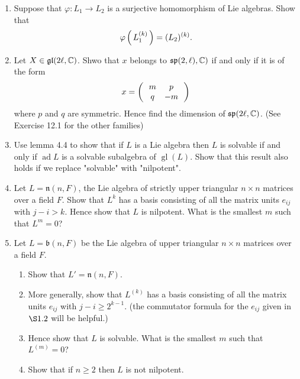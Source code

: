 \documentclass[12pt,a4paper]{report}
\newcommand{\GL}{\operatorname{gl}}
\newcommand{\AD}{\operatorname{ad}}
\begin{document}
\newcommand{\PPP}[1]{^{(#1)}}
\begin{enumerate}[label=4.\arabic*]

\item  Suppose that $\varphi:L_1 \to L_2$ is a surjective homomorphism of Lie algebras.  Show that 
\begin{align*}
	\varphi\PAREN{L_1\PPP{k}}=(L_2)\PPP{k}.
\end{align*}

\item Let $X \in \mathfrak{gl}(2\ell, \mathbb{C})$.  Shwo that $x$ belongs to $\mathfrak{sp}(2,\ell),\mathbb{C})$ if and only if it is of the form 
\begin{align*}
	x = \left (\,  \begin{array}{c c} m&p \\ q & -m \end{array}  \,\right )
\end{align*}where $p$ and $q$ are symmetric.  Hence find the dimension of $\mathfrak{sp}(2\ell, \mathbb{C})$.  (See Exercise 12.1 for the other families)

\item Use lemma 4.4 to show that if $L$ is a Lie algebra then $L$ is solvable if and only if $\AD L$ is a solvable subalgebra of $\GL(L)$.  Show that this result also holds if we replace "solvable" with "nilpotent".

\item Let $L=\mathfrak{n}(n,F)$, the Lie algebra of strictly upper triangular $n \times n$ matrices over a field $F$.  Show that $L^k$ has a basis consisting of all the matrix units $e_{ij}$ with $j-i>k$. Hence show that $L$ is nilpotent.  What is the smallest $m$ such that $L^m = 0$?

\item Let $L=\mathfrak{b}(n,F)$ be the Lie algebra of upper triangular $n\times n$ matrices over a field $F$.
\begin{enumerate}[label=(\roman*)]

	\item Show that $L'=\mathfrak{n}(n,F)$.
	
	\item More generally, show that $L\PPP{k}$ has a basis consisting of all the matrix units $e_{ij}$ with $j-i\ge 2^{k-1}$.  (the commutator formula for the $e_{ij}$ given in $\S1.2$ will be helpful.)
	
	\item Hence show that $L$ is solvable.  What is the smallest $m$ such that $L\PPP{m}=0$?
	
	\item Show that if $n\ge 2$ then $L$ is not nilpotent.


\end{enumerate}
\end{enumerate}
\end{document}
